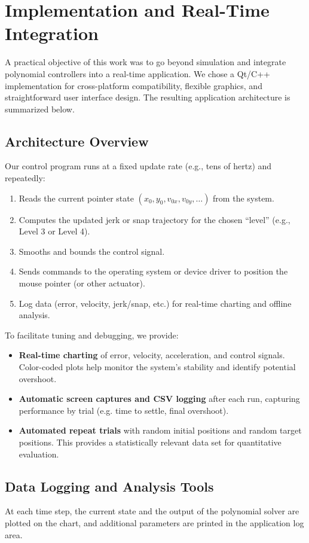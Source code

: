 \documentclass[12pt]{article}
\begin{document}
\section{Implementation and Real-Time Integration}
\label{sec:implementation}
A practical objective of this work was to go beyond simulation and integrate polynomial controllers into a real-time application. We chose a Qt/C++ implementation for cross-platform compatibility, flexible graphics, and straightforward user interface design. The resulting application architecture is summarized below.

\subsection{Architecture Overview}
Our control program runs at a fixed update rate (e.g., tens of hertz) and repeatedly:
\begin{enumerate}
    \item Reads the current pointer state $(x_0, y_0, v_{0x}, v_{0y}, \ldots)$ from the system.
    \item Computes the updated jerk or snap trajectory for the chosen ``level'' (e.g., Level 3 or Level 4).
    \item Smooths and bounds the control signal.
    \item Sends commands to the operating system or device driver to position the mouse pointer (or other actuator).
    \item Log data (error, velocity, jerk/snap, etc.) for real-time charting and offline analysis.
\end{enumerate}

To facilitate tuning and debugging, we provide:
\begin{itemize}
    \item \textbf{Real-time charting} of error, velocity, acceleration, and control signals. Color-coded plots help monitor the system’s stability and identify potential overshoot.
    \item \textbf{Automatic screen captures and CSV logging} after each run, capturing performance by trial (e.g. time to settle, final overshoot).
    \item \textbf{Automated repeat trials} with random initial positions and random target positions. This provides a statistically relevant data set for quantitative evaluation.
\end{itemize}

\subsection{Data Logging and Analysis Tools}
At each time step, the current state and the output of the polynomial solver are plotted on the chart, and additional parameters are printed in the application log area.
\end{document}
